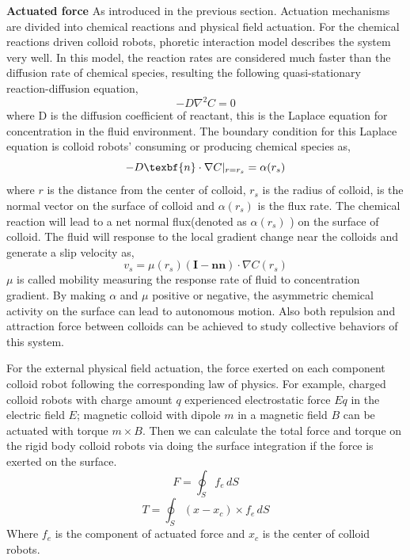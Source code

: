 \textbf{Actuated force} As introduced in the previous section. Actuation mechanisms are divided into chemical reactions and physical field actuation. For the chemical reactions driven colloid robots, phoretic interaction  model describes the system very well. \cite{golestanian2007,najafi2004simple,golestanian2005propulsion,golestanian2019phoretic} In this model, the reaction rates are considered much faster than the diffusion rate of chemical species, resulting the following   
quasi-stationary reaction-diffusion equation,
\begin{equation}
    -D\nabla^2 C=0
\end{equation}
where D is the diffusion coefficient of reactant, this is the Laplace equation for concentration in the fluid environment. The boundary condition for this Laplace equation is  colloid robots' consuming or producing chemical species as,
\begin{equation}
    -D \texbf{n}\cdot \nabla C|_{r=r_s}=\alpha(r_s)
\end{equation}
where $r$ is the distance from the center of colloid, $r_s$ is the radius of colloid,  is the normal vector on the surface of colloid and $\alpha(r_s)$ is the flux rate. The chemical reaction will lead to a net normal flux(denoted as $\alpha(r_s)$ ) on the surface of colloid. The fluid will response to the local gradient change near the colloids and generate a slip velocity as,
\begin{equation}
    v_s=\mu(r_s)(\textbf{I}-\textbf{n}\textbf{n})\cdot \nabla C(r_s)
\end{equation}
$\mu$ is called mobility measuring the response rate of fluid to concentration gradient. By making $\alpha$ and $\mu$ positive or negative, the asymmetric chemical activity on the surface can lead to autonomous motion.  Also both repulsion and attraction force between colloids can be achieved to study collective behaviors of this system. \cite{michelin2015autophoretic}

For the external physical field actuation, the force exerted on each component colloid robot following the corresponding law of physics. For example, charged colloid robots with charge amount $q$ experienced electrostatic force $Eq$ in the electric field $E$; magnetic colloid with dipole $m$ in a magnetic field $B$ can be actuated with torque $m\times B$.
Then we can calculate the total force and torque on the rigid body colloid robots via doing the surface integration if the force is exerted on the surface.
\begin{equation}
    F=\oint_S f_e \,dS
\end{equation}
\begin{equation}
    T=\oint_S (x-x_c)\times f_e \,dS
\end{equation}
Where $f_e$  is the component of actuated force and $x_c$ is the center of colloid robots.

